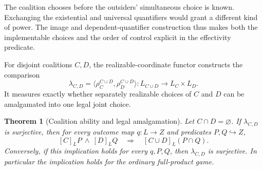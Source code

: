 \documentclass[11pt,a4paper]{article}
\numberwithin{equation}{section}
\newtheorem{theorem}{Theorem}[section]
\theoremstyle{definition}
\theoremstyle{remark}
\theoremstyle{plain}
\begin{document}
The coalition chooses before the outsiders' simultaneous choice is
known. Exchanging the existential and universal quantifiers would grant a
different kind of power. The image and dependent-quantifier construction
thus makes both the implementable choices and the order of control
explicit in the effectivity predicate.

For disjoint coalitions $C,D$, the realizable-coordinate functor constructs
the comparison
\begin{equation}
\label{eq:egt-choice-amalgamation-map}
 \lambda_{C,D}
 =\bigl\langle\rho_C^{C\cup D},\rho_D^{C\cup D}\bigr\rangle:
 L_{C\cup D}\longrightarrow L_C\times L_D.
\end{equation}
It measures exactly whether separately realizable choices of $C$ and $D$ can
be amalgamated into one legal joint choice.

\begin{theorem}[Coalition ability and legal amalgamation]
\label{thm:egt-superadditive}
Let $C\cap D=\varnothing$. If $\lambda_{C,D}$ is surjective, then for every
outcome map $q:L\to Z$ and predicates $P,Q\hookrightarrow Z$,
\[
 [C]_LP\ \wedge\ [D]_LQ
 \quad\Longrightarrow\quad
 [C\cup D]_L(P\cap Q).
\]
Conversely, if this implication holds for every $q,P,Q$, then
$\lambda_{C,D}$ is surjective. In particular the implication holds for the
ordinary full-product game.
\end{theorem}
\end{document}
